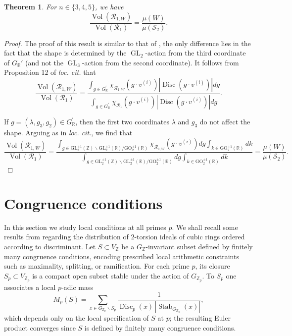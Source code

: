 \documentclass[table]{amsart}
\newtheorem{theorem}{Theorem}[section]
\newcommand{\op}[1]{\operatorname{#1}}
\numberwithin{equation}{section}
\begin{document}
\begin{theorem}\label{volume quotient}
     For $n \in\{3,4,5\}$, we have
$$
\frac{\operatorname{Vol}\left(\mathcal{R}_{1, W}\right)}{\operatorname{Vol}\left(\mathcal{R}_{1}\right)}=\frac{\mu(W)}{\mu\left(\mathcal{S}_{2}\right)} .
$$
\end{theorem}
\begin{proof}
     The proof of this result is similar to that of \cite[Theorem 7]{bhargavaharron}, the only difference lies in the fact that the shape is determined by the $\op{GL}_2$-action from the third coordinate of $G_{\mathbb{R}}'$ (and not the $\op{GL}_3$-action from the second coordinate). It follows from Proposition 12 of \emph{loc. cit.} that
\begin{equation*}
\frac{\operatorname{Vol}\left(\mathcal{R}_{1, W}\right)}{\operatorname{Vol}\left(\mathcal{R}_{1}\right)}=\frac{\int_{g \in G_{\mathbb{R}}^{\prime}} \chi_{\mathcal{R}_{1, W}}\left(g \cdot v^{(i)}\right)\left|\operatorname{Disc}\left(g \cdot v^{(i)}\right)\right| d g}{\int_{g \in G_{\mathbb{R}}^{\prime}} \chi_{\mathcal{R}_{1}}\left(g \cdot v^{(i)}\right)\left|\operatorname{Disc}\left(g \cdot v^{(i)}\right)\right| d g} .
\end{equation*}

If $g=\left(\lambda, g_3, g_2\right) \in G_{\mathbb{R}}^{\prime}$, then the first two coordinates $\lambda$ and $g_3$ do not affect the shape. Arguing as in \emph{loc. cit.}, we find that
$$
\frac{\operatorname{Vol}\left(\mathcal{R}_{1, W}\right)}{\operatorname{Vol}\left(\mathcal{R}_{1}\right)}=\frac{\int_{g \in \mathrm{GL}_{2}^{ \pm 1}(\mathbb{Z}) \backslash \mathrm{GL}_{2}^{ \pm 1}(\mathbb{R}) / \mathrm{GO}_{2}^{ \pm 1}(\mathbb{R})} \chi_{\mathcal{R}_{1, W}}\left(g \cdot v^{(i)}\right) d g \int_{k \in \mathrm{GO}_{2}^{ \pm 1}(\mathbb{R})} d k}{\int_{g \in \mathrm{GL}_{2}^{ \pm 1}(\mathbb{Z}) \backslash \mathrm{GL}_{2}^{ \pm 1}(\mathbb{R}) / \mathrm{GO}_{2}^{ \pm 1}(\mathbb{R})} d g \int_{k \in \mathrm{GO}_{2}^{ \pm 1}(\mathbb{R})} d k} =\frac{\mu(W)}{\mu\left(\mathcal{S}_{2}\right)}.
$$
\end{proof}

\section{Congruence conditions}

In this section we study local conditions at all primes $p$. We shall recall some results from \cite{BhargavaVarma} regarding the distribution of $2$-torsion ideals of cubic rings ordered according to discriminant. Let $S \subset V_{\mathbb{Z}}$ be a $G_{\mathbb{Z}}$-invariant subset defined by
finitely many congruence conditions, encoding prescribed local arithmetic
constraints such as maximality, splitting, or ramification. For each prime $p$,
its closure $S_p \subset V_{\mathbb{Z}_p}$ is a compact open subset stable under
the action of $G_{\mathbb{Z}_p}$. To $S_p$ one associates a local $p$-adic mass
\[
M_p(S)
=
\sum_{x \in G_{\mathbb{Z}_p}\backslash S_p}
\frac{1}{\operatorname{Disc}_p(x)\,|\operatorname{Stab}_{G_{\mathbb{Z}_p}}(x)|},
\]
which depends only on the local specification of $S$ at $p$; the resulting Euler
product converges since $S$ is defined by finitely many congruence conditions.
\end{document}
